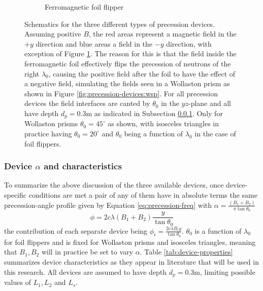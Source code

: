 \documentclass{article}
\begin{document}
\begin{figure}[htbp]
\begin{subfigure}[b]{0.3\textwidth}
		\caption{Ferromagnetic foil flipper}
		\label{fig:precession-devices:foil}
	\end{subfigure}
	\caption{Schematics for the three different types of precession devices. Assuming positive $B$, the red areas represent a magnetic field in the $+y$ direction and blue areas a field in the $-y$ direction, with exception of Figure \ref{fig:precession-devices:foil}. The reason for this is that the field inside the ferromagnetic foil effectively flips the precession of neutrons of the right $\lambda_0$, causing the positive field after the foil to have the effect of a negative field, simulating the fields seen in a Wollaston prism as shown in Figure \ref{fig:precession-devices:wsp}. For all precession devices the field interfaces are canted by $\theta_0$ in the $yz$-plane and all have depth $d_p = 0.3\unit\meter$ as indicated in Subsection \ref{c3.3.4}. Only for Wollaston prisms $\theta_0 = 45 ^\circ$ as shown, with isosceles triangles in practice having $\theta_0 = 20^\circ$ and $\theta_0$ being a function of $\lambda_0$ in the case of foil flippers.}
	\label{fig:precession-devices}
\end{figure}

\subsubsection{Device $\alpha$ and characteristics}
\label{c3.3.4}
To summarize the above discussion of the three available devices, once device-specific conditions are met a pair of any of them have in absolute terms the same precession-angle profile given by Equation \eqref{eq:precession-freq} with $\alpha = \frac{(B_1 + B_2)}{\pi\tan\theta_0}$
\begin{equation}
	\phi = 2c\lambda (B_1 + B_2)\frac{y}{\tan\theta_0} \label{eq:device-prec}
\end{equation}
the contribution of each separate device being $\phi_i = \frac{2c\lambda B_i y}{\tan\theta_0}$. $\theta_0$ is a function of $\lambda_0$ for foil flippers and is fixed for Wollaston prisms and isosceles triangles, meaning that $B_1, B_2$ will in practice be set to vary $\alpha$. Table \ref{tab:device-properties} summarizes device characteristics as they appear in literature that will be used in this research. All devices are assumed to have depth $d_p = 0.3 \unit{\meter}$, limiting possible values of $L_1, L_2$ and $L_s$. 
\end{document}

